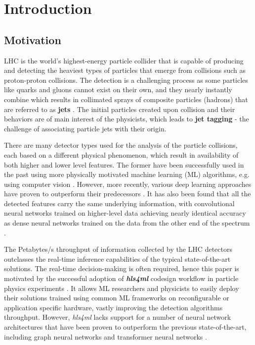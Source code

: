 \chapter{Introduction}

\section{Motivation}\label{motivation}
LHC is the world's highest-energy particle collider that is capable of producing and detecting the heaviest types of particles that emerge from collisions such as proton-proton collisions. The detection is a challenging process as some particles like quarks and gluons cannot exist on their own, and they nearly instantly combine which results in collimated sprays of composite particles (hadrons) that are referred to as \textbf{jets} \cite{4-cernjets}. The initial particles created upon collision and their behaviors are of main interest of the physicists, which leads to \textbf{jet tagging} - the challenge of associating particle jets with their origin.

There are many detector types used for the analysis of the particle collisions, each based on a different physical phenomenon, which result in availability of both higher and lower level features. The former have been successfully used in the past using more physically motivated machine learning (ML) algorithms, e.g. using computer vision \cite{5-cogan2015jet-images:}. However, more recently, various deep learning approaches have proven to outperform their predecessors \cite{6-de2016jet-images}. It has also been found that all the detected features carry the same underlying information, with convolutional neural networks trained on higher-level data achieving nearly identical accuracy as dense neural networks trained on the data from the other end of the spectrum \cite{7-moore2019reports}.

The Petabytes/s throughput of information collected by the LHC detectors outclasses the real-time inference capabilities of the typical state-of-the-art solutions. The real-time decision-making is often required, hence this paper is motivated by the successful adoption of  \textit{\textbf{hls4ml}} codesign workflow in particle physics experiments \cite{8-fahim2021hls4ml:}. It allows ML researchers and physicists to easily deploy their solutions trained using common ML frameworks on reconfigurable or application specific hardware, vastly improving the detection algorithms throughput. However, \textit{hls4ml} lacks support for a number of neural network architectures that have been proven to outperform the previous state-of-the-art, including graph neural networks \cite{9-newman2019jedi-net:, 11-elabd2021graph} and transformer neural networks \cite{3-yuan2021constituentnet:}.


